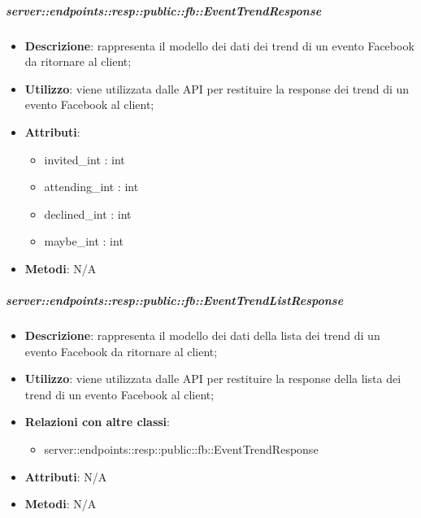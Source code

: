     \subparagraph{server::endpoints::resp::public::fb::EventTrendResponse} %
    \label{subp:bdsm_app_server_endpoints_resp_public_fb_eventtrendresponse}
    \begin{itemize}
      \item \textbf{Descrizione}: rappresenta il modello dei dati dei trend di un evento Facebook da ritornare al client;
      \item \textbf{Utilizzo}: viene utilizzata dalle API per restituire la response dei trend di un evento Facebook al client;
      
	  \item \textbf{Attributi}:  
	  	\begin{itemize}
	  		\item invited\_int : int
	  		\item attending\_int : int
	  		\item declined\_int : int
	  		\item maybe\_int : int
	  	\end{itemize}
	  \item \textbf{Metodi}: N/A
      \end{itemize}

    \subparagraph{server::endpoints::resp::public::fb::EventTrendListResponse} %
    \label{subp:bdsm_app_server_endpoints_resp_public_fb_eventtrendlistresponse}
    \begin{itemize}
      \item \textbf{Descrizione}: rappresenta il modello dei dati della lista dei trend di un evento Facebook da ritornare al client;
      \item \textbf{Utilizzo}: viene utilizzata dalle API per restituire la response della lista dei trend di un evento Facebook al client;
      \item \textbf{Relazioni con altre classi}:
        \begin{itemize}
          \item server::endpoints::resp::public::fb::EventTrendResponse
        \end{itemize}
	  \item \textbf{Attributi}: N/A
	  \item \textbf{Metodi}: N/A
      \end{itemize}

